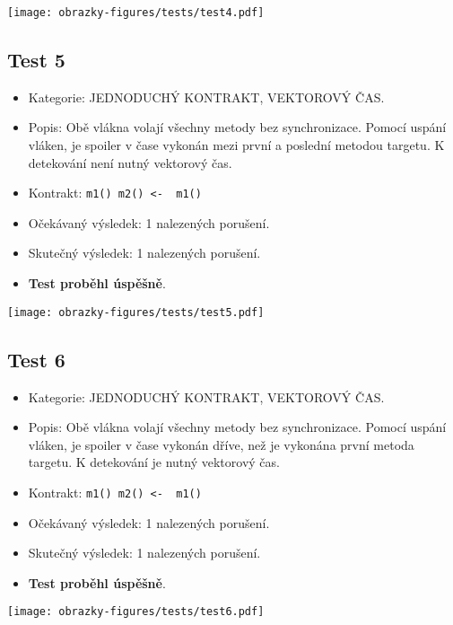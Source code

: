 \begin{center}
    \centering
    \texttt{[image: obrazky-figures/tests/test4.pdf]}
    \label{test4}
\end{center}

\subsection*{Test 5}
\begin{itemize}

\item Kategorie: JEDNODUCHÝ KONTRAKT, VEKTOROVÝ ČAS.
\item Popis: Obě vlákna volají všechny metody bez synchronizace. Pomocí uspání vláken, je spoiler v čase vykonán mezi první a poslední metodou targetu. K detekování není nutný vektorový čas.
\item Kontrakt: \texttt{m1() m2() <- { m1() }}
\item Očekávaný výsledek: 1 nalezených porušení.
\item Skutečný výsledek: 1 nalezených porušení.
\item \textbf{Test proběhl úspěšně}.
\end{itemize}

\begin{center}
    \centering
    \texttt{[image: obrazky-figures/tests/test5.pdf]}
    \label{test5}
\end{center}

\subsection*{Test 6}
\begin{itemize}
\item Kategorie: JEDNODUCHÝ KONTRAKT, VEKTOROVÝ ČAS.
\item Popis: Obě vlákna volají všechny metody bez synchronizace. Pomocí uspání vláken, je spoiler v čase vykonán dříve, než je vykonána první metoda targetu. K detekování je nutný vektorový čas.
\item Kontrakt: \texttt{m1() m2() <- { m1() }}
\item Očekávaný výsledek: 1 nalezených porušení.
\item Skutečný výsledek: 1 nalezených porušení.
\item \textbf{Test proběhl úspěšně}.
\end{itemize}

\begin{center}
    \centering
    \texttt{[image: obrazky-figures/tests/test6.pdf]}
    \label{test6}
\end{center}
